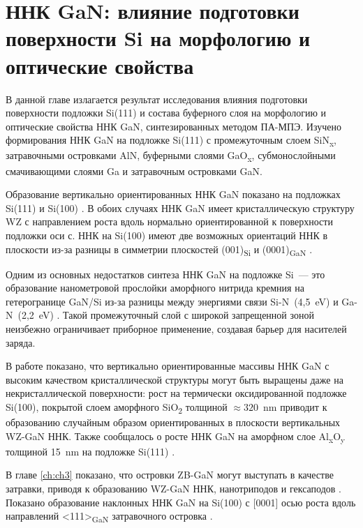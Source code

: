 \chapter{ННК GaN: влияние подготовки поверхности Si на морфологию и оптические
свойства}\label{ch:ch4}

В данной главе излагается результат исследования влияния подготовки поверхности
подложки Si(111) и состава буферного слоя на морфологию и оптические свойства
ННК GaN, синтезированных методом ПА-МПЭ. Изучено формирования ННК GaN на
подложке Si(111) с промежуточным слоем SiN\textsubscript{x}, затравочными
островками AlN, буферными слоями GaO\textsubscript{x}, субмонослойными
смачивающими слоями Ga и затравочным островками GaN.

Образование вертикально ориентированных ННК GaN показано на подложках Si(111) и
Si(100) \cite{Corfdir2009}. В обоих случаях ННК GaN имеет кристаллическую
структуру WZ с направлением роста вдоль нормально ориентированной к поверхности
подложки оси с. ННК на Si(100) имеют две возможных ориентаций ННК в плоскости
из-за разницы в симметрии плоскостей (001)\textsubscript{Si} и
(0001)\textsubscript{GaN} \cite{Largeau2008}.

Одним из основных недостатков синтеза ННК GaN на подложке Si~--- это
образование нанометровой прослойки аморфного нитрида кремния на гетерогранице
GaN/Si из-за разницы между энергиями связи Si-N~(4,5~\si{\electronvolt}) и
Ga-N~(2,2~\si{\electronvolt}) \cite{Stoica2008}. Такой промежуточный слой с
широкой запрещенной зоной неизбежно ограничивает приборное применение, создавая
барьер для насителей заряда.

В работе \cite{Stoica2008} показано, что вертикально ориентированные массивы
ННК GaN с высоким качеством кристаллической структуры могут быть выращены даже
на некристаллической поверхности: рост на термически оксидированной подложке
Si(100), покрытой слоем аморфного SiO\textsubscript{2} толщиной \(\approx
320\)~\si{\nano\meter} приводит к образованию случайным образом ориентированных
в плоскости вертикальных WZ-GaN ННК.  Также сообщалось о росте ННК GaN на
аморфном слое Al\textsubscript{x}O\textsubscript{y} толщиной
15~\si{\nano\meter} на подложке Si(111) \cite{Sobanska2016}.

В главе \cref{ch:ch3} показано, что островки ZB-GaN могут выступать в качестве
затравки, приводя к образованию WZ-GaN ННК, нанотриподов и гексаподов
\cite{Lee2010, Wang2017}. Показано образование наклонных ННК GaN на Si(100) с
[0001] осью роста вдоль направлений <111>\textsubscript{GaN} затравочного
островка \cite{Borysiuk2014}.


